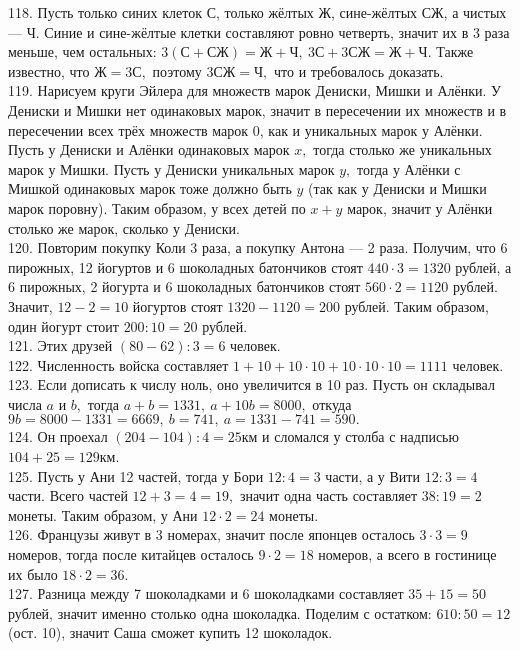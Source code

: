 118. Пусть только синих клеток С, только жёлтых Ж, сине-жёлтых СЖ, а чистых --- Ч. Синие и сине-жёлтые клетки составляют ровно четверть, значит их в 3 раза меньше, чем остальных: $3(\text{С}+\text{СЖ})=\text{Ж}+\text{Ч},\ 3\text{С}+3\text{СЖ}=\text{Ж}+\text{Ч}.$ Также известно, что $\text{Ж}=3\text{С},$ поэтому $3\text{СЖ}=\text{Ч},$ что и требовалось доказать.\\
119. Нарисуем круги Эйлера для множеств марок Дениски, Мишки и Алёнки. У Дениски и Мишки нет одинаковых марок, значит в пересечении их множеств и в пересечении всех трёх множеств марок 0, как и уникальных марок у Алёнки. Пусть у Дениски и Алёнки одинаковых марок $x,$ тогда столько же уникальных марок у Мишки. Пусть у Дениски уникальных марок $y,$ тогда у Алёнки с Мишкой одинаковых марок тоже должно быть $y$ (так как у Дениски и Мишки марок поровну). Таким образом, у всех детей по $x+y$ марок, значит у Алёнки столько же марок, сколько у Дениски.\\
120. Повторим покупку Коли 3 раза, а покупку Антона --- 2 раза. Получим, что 6 пирожных, 12 йогуртов и 6 шоколадных батончиков стоят $440\cdot3=1320$ рублей, а 6 пирожных, 2 йогурта и 6 шоколадных батончиков стоят $560\cdot2=1120$ рублей. Значит, $12-2=10$ йогуртов стоят $1320-1120=200$ рублей. Таким образом, один йогурт стоит $200:10=20$ рублей.\\
121. Этих друзей $(80-62):3=6$ человек.\\
122. Численность войска составляет $1+10+10\cdot10+10\cdot10\cdot10=1111$ человек.\\
123. Если дописать к числу ноль, оно увеличится в 10 раз. Пусть он складывал числа $a$ и $b,$ тогда $a+b=1331,\ a+10b=8000,$ откуда $9b=8000-1331=6669,\ b=741,\ a=1331-741=590.$\\
124. Он проехал $(204-104):4=25$км и сломался у столба с надписью $104+25=129$км.\\
125. Пусть у Ани 12 частей, тогда у Бори $12:4=3$ части, а у Вити $12:3=4$ части. Всего частей $12+3=4=19,$ значит одна часть составляет $38:19=2$ монеты. Таким образом, у Ани $12\cdot2=24$ монеты.\\
126. Французы живут в 3 номерах, значит после японцев осталось $3\cdot3=9$ номеров, тогда после китайцев осталось $9\cdot2=18$ номеров, а всего в гостинице их было $18\cdot2=36.$\\
127. Разница между 7 шоколадками и 6 шоколадками составляет $35+15=50$ рублей, значит именно столько одна шоколадка. Поделим с остатком: $610:50=12$ (ост. 10), значит Саша сможет купить 12 шоколадок.\\
